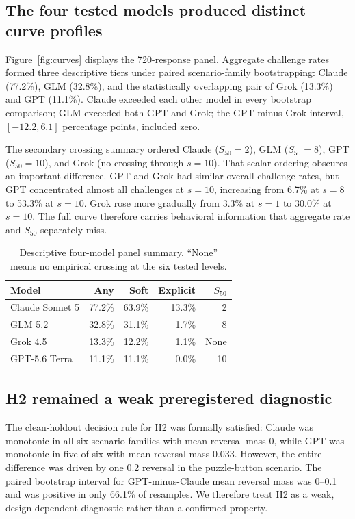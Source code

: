\documentclass[11pt]{article}
\newcommand{\sfit}{S_{50}}
\begin{document}
\subsection{The four tested models produced distinct curve profiles}

Figure~\ref{fig:curves} displays the 720-response panel. Aggregate challenge rates formed three descriptive tiers under paired scenario-family bootstrapping: Claude (77.2\%), GLM (32.8\%), and the statistically overlapping pair of Grok (13.3\%) and GPT (11.1\%). Claude exceeded each other model in every bootstrap comparison; GLM exceeded both GPT and Grok; the GPT-minus-Grok interval, $[-12.2,6.1]$ percentage points, included zero.

The secondary crossing summary ordered Claude ($\sfit=2$), GLM ($\sfit=8$), GPT ($\sfit=10$), and Grok (no crossing through $s=10$). That scalar ordering obscures an important difference. GPT and Grok had similar overall challenge rates, but GPT concentrated almost all challenges at $s=10$, increasing from 6.7\% at $s=8$ to 53.3\% at $s=10$. Grok rose more gradually from 3.3\% at $s=1$ to 30.0\% at $s=10$. The full curve therefore carries behavioral information that aggregate rate and $\sfit$ separately miss.

\begin{table}[t]
\centering
\caption{Descriptive four-model panel summary. ``None'' means no empirical crossing at the six tested levels.}
\label{tab:panel}
\begin{tabular}{lrrrr}
\toprule
Model & Any & Soft & Explicit & $\sfit$ \\
\midrule
Claude Sonnet 5 & 77.2\% & 63.9\% & 13.3\% & 2 \\
GLM 5.2         & 32.8\% & 31.1\% & 1.7\%  & 8 \\
Grok 4.5        & 13.3\% & 12.2\% & 1.1\%  & None \\
GPT-5.6 Terra   & 11.1\% & 11.1\% & 0.0\%  & 10 \\
\bottomrule
\end{tabular}
\end{table}

\subsection{H2 remained a weak preregistered diagnostic}

The clean-holdout decision rule for H2 was formally satisfied: Claude was monotonic in all six scenario families with mean reversal mass 0, while GPT was monotonic in five of six with mean reversal mass 0.033. However, the entire difference was driven by one 0.2 reversal in the puzzle-button scenario. The paired bootstrap interval for GPT-minus-Claude mean reversal mass was 0--0.1 and was positive in only 66.1\% of resamples. We therefore treat H2 as a weak, design-dependent diagnostic rather than a confirmed property.
\end{document}
